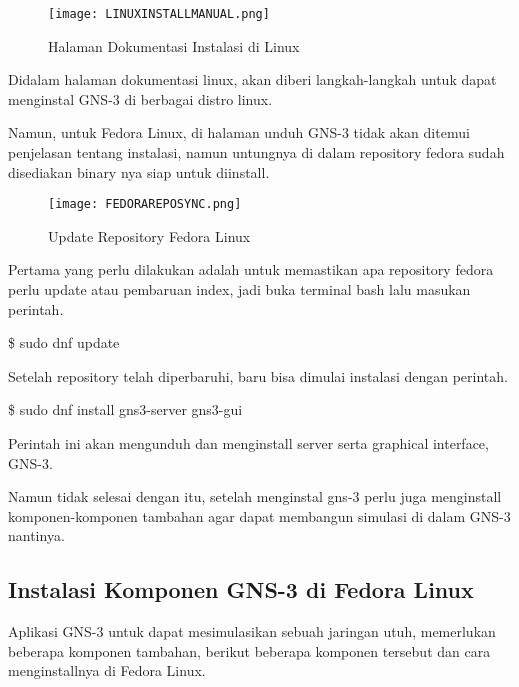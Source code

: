 \documentclass[12pt, a4paper]{article}
\begin{document}
      \begin{figure}[h]
          \centering
          \texttt{[image: LINUXINSTALLMANUAL.png]}
          \caption{\small{Halaman Dokumentasi Instalasi di Linux}}
      \end{figure}

      Didalam halaman dokumentasi linux, akan diberi langkah-langkah untuk 
      dapat menginstal GNS-3 di berbagai distro linux.

      Namun, untuk Fedora Linux, di halaman unduh GNS-3 tidak akan ditemui penjelasan
      tentang instalasi, namun untungnya di dalam repository fedora sudah disediakan
      binary nya siap untuk diinstall.

      \begin{figure}[h]
          \centering
          \texttt{[image: FEDORAREPOSYNC.png]}
          \caption{\small{Update Repository Fedora Linux}}
      \end{figure}

      Pertama yang perlu dilakukan adalah untuk memastikan apa repository fedora
      perlu update atau pembaruan index, jadi buka terminal bash lalu
      masukan perintah.
      
      \$ sudo dnf update

      Setelah repository telah diperbaruhi, baru bisa dimulai instalasi dengan
      perintah.

      \$ sudo dnf install gns3-server gns3-gui

      Perintah ini akan mengunduh dan menginstall server serta graphical interface,
      GNS-3.

      Namun tidak selesai dengan itu, setelah menginstal gns-3 perlu juga menginstall
      komponen-komponen tambahan agar dapat membangun simulasi di dalam GNS-3 nantinya.

      \subsection{Instalasi Komponen GNS-3 di Fedora Linux}

      Aplikasi GNS-3 untuk dapat mesimulasikan sebuah jaringan utuh, 
      memerlukan beberapa komponen tambahan, berikut beberapa komponen
      tersebut dan cara menginstallnya di Fedora Linux.
\end{document}
